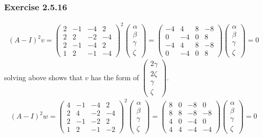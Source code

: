 \documentclass[12pt, letterpaper]{scrartcl}
\begin{document}
\subsubsection*{Exercise 2.5.16}
\begin{align*}
    (A-I)^2v=
    \left(\begin{array}{cccc}
        2 & -1 & -4 & 2 \\
        2 & 2 & -2 & -4\\
        2 & -1 & -4 & 2\\
        1 & 2 & -1 & -4
    \end{array}\right)^2
    \left(\begin{array}{c} \alpha \\ \beta \\ \gamma \\ \zeta \end{array}\right)
    =
    \left(\begin{array}{cccc}
        -4 & 4 & 8 & -8 \\
        0 & -4 & 0 & 8\\
        -4 & 4 & 8 & -8\\
        0 & -4 & 0 & 8
    \end{array}\right)
    \left(\begin{array}{c} \alpha \\ \beta \\ \gamma \\ \zeta \end{array}\right)=0
\end{align*}
solving above shows that $v$ has the form of $\left(\begin{array}{c} 2\gamma \\ 2\zeta \\ \gamma \\ \zeta \end{array}\right)$. 
\begin{align*}
    (A-I)^2w=
    \left(\begin{array}{cccc}
        4 & -1 & -4 & 2 \\
        2 & 4 & -2 & -4\\
        2 & -1 & -2 & 2\\
        1 & 2 & -1 & -2
    \end{array}\right)^2
    \left(\begin{array}{c} \alpha \\ \beta \\ \gamma \\ \zeta \end{array}\right)
    =
    \left(\begin{array}{cccc}
        8 & 0 & -8 & 0 \\
        8 & 8 & -8 & -8\\
        4 & 0 & -4 & 0\\
        4 & 4 & -4 & -4
    \end{array}\right)
    \left(\begin{array}{c} \alpha \\ \beta \\ \gamma \\ \zeta \end{array}\right)=0
\end{align*}
\end{document}
